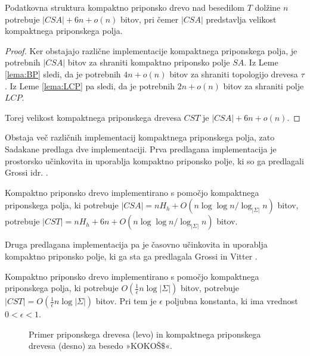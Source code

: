 \begin{izr}
    Podatkovna struktura kompaktno priponsko drevo nad besedilom $T$ dolžine $n$ potrebuje $|CSA|+6n+o(n)$ bitov, pri čemer $|CSA|$ predstavlja velikost kompaktnega priponskega polja.
\end{izr}
\begin{proof}
    Ker obstajajo različne implementacije kompaktnega priponskega polja, je potrebnih $|CSA|$ bitov za shraniti kompaktno priponsko polje $SA$. Iz Leme \ref{lema:BP} sledi, da je potrebnih $4n+o(n)$ bitov za shraniti topologijo drevesa $\tau$. Iz Leme \ref{lema:LCP} pa sledi, da je potrebnih $2n+o(n)$ bitov za shraniti polje $LCP$.

    Torej velikost kompaktnega priponskega drevesa $CST$ je $|CSA|+6n+o(n)$.
\end{proof}

Obstaja več različnih implementacij kompaktnega priponskega polja, zato Sadakane \cite{Sadakane2007} predlaga dve implementaciji. Prva predlagana implementacija je prostorsko učinkovita in uporablja kompaktno priponsko polje, ki so ga predlagali Grossi idr. \cite{Grossi2003}. 

\begin{posl}\label{pos:CSAnh}
Kompaktno priponsko drevo implementirano s pomočjo kompaktnega priponskega polja, ki potrebuje $|CSA|=nH_h+O(n\log\log{n} / \log_{| \Sigma|}{n})$ bitov, potrebuje $|CST|= nH_h+6n+O(n\log\log{n} / \log_{| \Sigma|}{n})$ bitov.    
\end{posl}

Druga predlagana implementacija pa je časovno učinkovita in uporablja kompaktno priponsko polje, ki ga sta ga predlagala Grossi in Vitter \cite{Grossi2000}. 
\begin{posl}\label{pos:CSAlog}
Kompaktno priponsko drevo implementirano s pomočjo kompaktnega priponskega polja, ki potrebuje $O(\frac{1}{\epsilon}n\log{| \Sigma|})$ bitov, potrebuje $|CST|=O(\frac{1}{\epsilon}n\log{| \Sigma|})$ bitov. Pri tem je $\epsilon$ poljubna konstanta, ki ima vrednost $0<\epsilon<1$.
\end{posl}

\begin{figure}[tb]
    \begin{center}
        
        \caption{Primer priponskega drevesa (levo) in kompaktnega priponskega drevesa (desno) za besedo »KOKOŠ$\$$«.} 
        \label{fig:CST}
    \end{center}
\end{figure}

